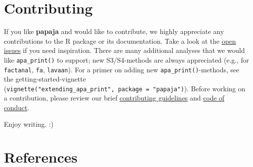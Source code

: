 \documentclass[
  english,
  ,man,floatsintext]{apa6}
\begin{document}
\section{Contributing}\label{contributing}

If you like \textbf{papaja} and would like to contribute, we highly appreciate any contributions to the R package or its documentation.
Take a look at the \href{https://github.com/crsh/papaja/issues}{open issues} if you need inspiration.
There are many additional analyses that we would like \texttt{apa\_print()} to support; new S3/S4-methods are always appreciated (e.g., for \texttt{factanal}, \texttt{fa}, \texttt{lavaan}).
For a primer on adding new \texttt{apa\_print()}-methods, see the getting-started-vignette (\texttt{vignette("extending\_apa\_print",\ package\ =\ "papaja")}).
Before working on a contribution, please review our brief \href{https://github.com/crsh/papaja/blob/master/.github/CONTRIBUTING.md}{contributing guidelines} and \href{https://github.com/crsh/papaja/blob/main/CODE_OF_CONDUCT.md}{code of conduct}.

Enjoy writing.
:)

\pagebreak

\section{References}\label{references}

\setlength{\parindent}{-0.5in}
\setlength{\leftskip}{0.5in}
\end{document}
